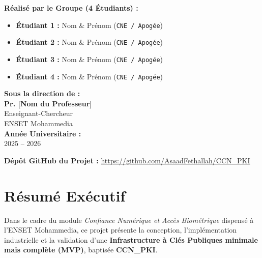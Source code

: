 \documentclass[12pt,a4paper]{report}
\begin{document}
\begin{titlepage}
\begin{center}
        \begin{minipage}[t]{0.52\textwidth}
            \textbf{Réalisé par le Groupe (4 Étudiants) :}\\[0.3cm]
            \begin{itemize}
                \item \textbf{Étudiant 1 : } Nom \& Prénom (\texttt{CNE / Apogée})
                \item \textbf{Étudiant 2 : } Nom \& Prénom (\texttt{CNE / Apogée})
                \item \textbf{Étudiant 3 : } Nom \& Prénom (\texttt{CNE / Apogée})
                \item \textbf{Étudiant 4 : } Nom \& Prénom (\texttt{CNE / Apogée})
            \end{itemize}
        \end{minipage}
        \hfill
        \begin{minipage}[t]{0.42\textwidth}
            \begin{flushright}
                \textbf{Sous la direction de :}\\[0.3cm]
                \textbf{Pr. [Nom du Professeur]}\\[0.1cm]
                {\small Enseignant-Chercheur}\\[0.1cm]
                {\small ENSET Mohammedia}\\[1.5cm]
                \textbf{Année Universitaire :}\\[0.1cm]
                2025 -- 2026
            \end{flushright}
        \end{minipage}

        \vfill
        {\footnotesize \textbf{Dépôt GitHub du Projet :} \url{https://github.com/AsaadFethallah/CCN_PKI}}
    \end{center}
\end{titlepage}


\chapter*{Résumé Exécutif}
Dans le cadre du module \textit{Confiance Numérique et Accès Biométrique} dispensé à l'ENSET Mohammedia, ce projet présente la conception, l'implémentation industrielle et la validation d'une \textbf{Infrastructure à Clés Publiques minimale mais complète (MVP)}, baptisée \textbf{CCN\_PKI}. 
\end{document}
